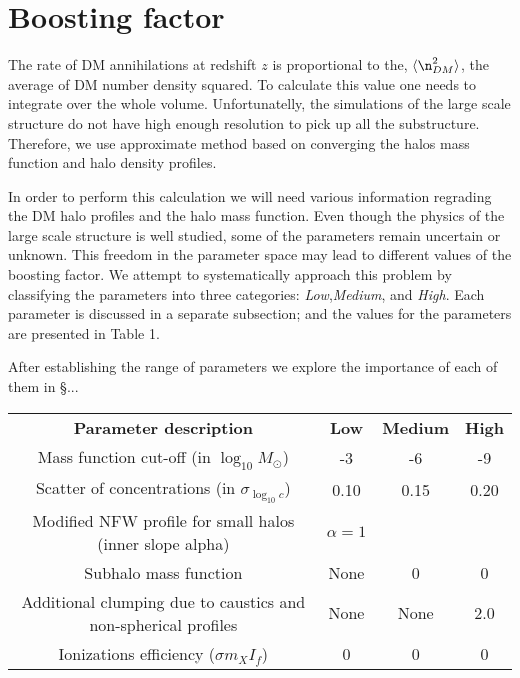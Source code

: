 \section{Boosting factor}
\label{sec:boosting}

The rate of DM annihilations at redshift $z$ is proportional to the, $\langle \n_{DM}^2 \rangle$, the average of DM number density squared. To calculate this value one needs to integrate over the whole volume. Unfortunatelly, the simulations of the large scale structure do not have high enough resolution to pick up all the substructure. Therefore, we use approximate method based on converging the halos mass function and halo density profiles.

In order to perform this calculation we will need various information regrading the DM halo profiles and the halo mass function. Even though the physics of the large scale structure is well studied, some of the parameters remain uncertain or unknown. This freedom in the parameter space may lead to different values of the boosting factor. We attempt to systematically approach this problem by classifying the parameters into three categories: \textit{Low},\textit{Medium}, and \textit{High}. Each parameter is discussed in a separate subsection; and the values for the parameters are presented in Table 1.

After establishing the range of parameters we explore the importance of each of them in \S ... 

\begin{table}
    \begin{tabular}{ c c c c }
    \textbf{Parameter description}                                    & \textbf{Low} & \textbf{Medium} & \textbf{High} \hline \hline \\
    Mass function cut-off (in $\log_{10}M_\odot$)        & -3 & -6 & -9 \\
    Scatter of concentrations (in $\sigma_{\log_{10}c}$)              & 0.10 & 0.15 & 0.20 \\
    Modified NFW profile for small halos (inner slope alpha) & $\alpha=1$ & \cite{Ishiyama_2014} &  \cite{Ishiyama_2014} \\
    Subhalo mass function & None & 0 & 0 \\
    Additional clumping due to caustics and non-spherical profiles & None & None & 2.0
\\    
    Ionizations efficiency ($\sigma m_X I_f$) & 0 & 0 & 0
\\    \end{tabular}
\end{table}
